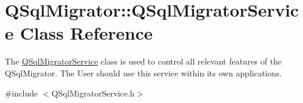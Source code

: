 \hypertarget{class_q_sql_migrator_1_1_q_sql_migrator_service}{}\section{Q\+Sql\+Migrator\+:\+:Q\+Sql\+Migrator\+Service Class Reference}
\label{class_q_sql_migrator_1_1_q_sql_migrator_service}


The \hyperlink{class_q_sql_migrator_1_1_q_sql_migrator_service}{Q\+Sql\+Migrator\+Service} class is used to control all relevant features of the Q\+Sql\+Migrator. The User should use this service within it\textquotesingle{}s own applications.  




{\ttfamily \#include $<$Q\+Sql\+Migrator\+Service.\+h$>$}

